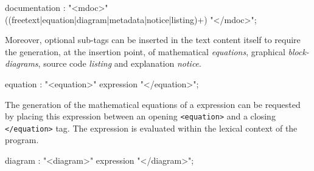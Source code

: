 
\begin{rail}
documentation : "<mdoc>" ((freetext|equation|diagram|metadata|notice|listing)+) "</mdoc>";
\end{rail}

Moreover, optional sub-tags can be inserted in the text content itself to require the generation, at the insertion point, of mathematical \textit{equations}, graphical \textit{block-diagrams}, \faust source code \textit{listing} and explanation \textit{notice}.


\begin{rail}
equation : "<equation>" expression "</equation>";
\end{rail}

The generation of the mathematical equations of a \faust expression can be requested by placing this expression between an opening \lstinline'<equation>' and a closing \lstinline'</equation>' tag. The expression is evaluated within the lexical context of the \faust program.


\begin{rail}
diagram : "<diagram>" expression "</diagram>";
\end{rail}

